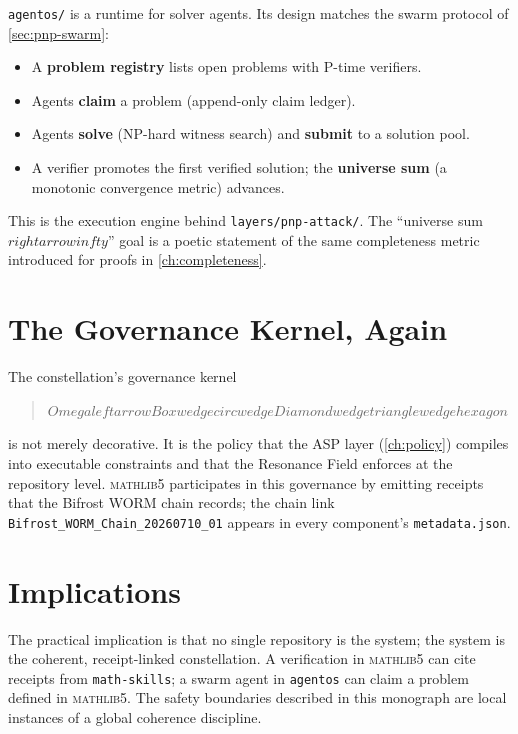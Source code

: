 \texttt{agentos/} is a runtime for solver agents. Its design matches the
swarm protocol of \cref{sec:pnp-swarm}:
\begin{itemize}
  \item A \textbf{problem registry} lists open problems with P-time
        verifiers.
  \item Agents \textbf{claim} a problem (append-only claim ledger).
  \item Agents \textbf{solve} (NP-hard witness search) and \textbf{submit} to
        a solution pool.
  \item A verifier promotes the first verified solution; the
        \textbf{universe sum} (a monotonic convergence metric) advances.
\end{itemize}
This is the execution engine behind \texttt{layers/pnp-attack/}. The
``universe sum $\ensuremath{rightarrow} \ensuremath{infty}$'' goal is a poetic statement of the same
completeness metric introduced for proofs in \cref{ch:completeness}.

\section{The Governance Kernel, Again}
\label{sec:con-gov}

The constellation's governance kernel
\begin{quote}
\centering
$\ensuremath{Omega} \ensuremath{leftarrow} \ensuremath{Box} \ensuremath{wedge} \ensuremath{circ} \ensuremath{wedge} \ensuremath{Diamond} \ensuremath{wedge} \ensuremath{triangle} \ensuremath{wedge} \ensuremath{hexagon}$
\end{quote}
is not merely decorative. It is the policy that the ASP layer
(\cref{ch:policy}) compiles into executable constraints and that the
Resonance Field enforces at the repository level. \textsc{mathlib5}
participates in this governance by emitting receipts that the Bifrost WORM
chain records; the chain link \texttt{Bifrost\_WORM\_Chain\_20260710\_01}
appears in every component's \texttt{metadata.json}.

\section{Implications}
\label{sec:con-implications}

The practical implication is that no single repository is the system; the
system is the coherent, receipt-linked constellation. A verification in
\textsc{mathlib5} can cite receipts from \texttt{math-skills}; a swarm agent
in \texttt{agentos} can claim a problem defined in \textsc{mathlib5}. The
safety boundaries described in this monograph are local instances of a
global coherence discipline.

